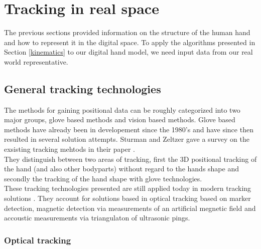 \chapter{Tracking in real space}
The previous sections provided information on the structure of the human hand and how to represent it in the digital space. To apply the algorithms presented in Section \ref{kinematics} to our digital hand model, we need input data from our real world representative.
\section{General tracking technologies}
\label{General tracking technologies}
The methods for gaining positional data can be roughly categorized into two major groups, glove based methods and vision based methods. Glove based methods have already been in developement since the 1980's \cite{Bolt.1980} and have since then resulted in several solution attempts. Sturman and Zeltzer gave a survey on the exsisting tracking mehtods in their paper \cite{Sturman.1994b}. \\They distinguish between two areas of tracking, first the  3D positional tracking of the hand (and also other bodyparts) without regard to the hands shape and secondly the tracking of the hand shape with glove technologies.\\These tracking technologies presented are still applied today in modern tracking solutions \cite{Welch.2002,Rolland.2001}. They account for solutions based in optical tracking based on marker detection, magnetic detection via measurements of an artificial megnetic field\cite{Raab.1979} and accoustic measurements via triangulaton of ultrasonic pings.

\subsection{Optical tracking}

